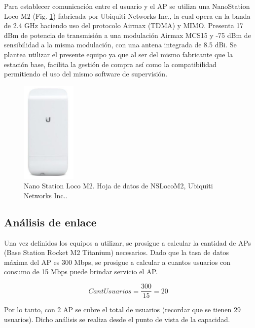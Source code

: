 \documentclass[12pt,a4paper]{book}
\begin{document}
Para establecer comunicación entre el usuario y el AP se utiliza una NanoStation Loco M2 (Fig. \ref{Fig_NSLocoM2}) fabricada por Ubiquiti Networks Inc., la cual opera en la banda de 2.4 GHz haciendo uso del protocolo Airmax (TDMA) y MIMO. Presenta 17 dBm de potencia de transmisión a una modulación Airmax MCS15 y -75 dBm de sensibilidad a la misma modulación, con una antena integrada de 8.5 dBi. Se plantea utilizar el presente equipo ya que al ser del mismo fabricante que la estación base, facilita la gestión de compra así como la compatibilidad permitiendo el uso del mismo software de supervisión.

\medskip

\begin{figure} [H]
\centering
\includegraphics[height= 5cm]{../figuras/NanoStationLocoM2.JPG}
\caption{Nano Station Loco M2. Hoja de datos de NSLocoM2, Ubiquiti Networks Inc..}
\label{Fig_NSLocoM2}
\end{figure}

\medskip

\subsection{Análisis de enlace}\label{sub_analisis_enlace_acc}

Una vez definidos los equipos a utilizar, se prosigue a calcular la cantidad de APs (Base Station Rocket M2 Titanium) necesarios. Dado que la tasa de datos máxima del AP es 300 Mbps, se prosigue a calcular a cuantos usuarios con consumo de 15 Mbps puede brindar servicio el AP.

\begin{equation}\label{ec_CantUsuariosAP}
CantUsuarios = \frac{300}{15} = 20 
\end{equation}

Por lo tanto, con 2 AP se cubre el total de usuarios (recordar que se tienen 29 usuarios). Dicho análisis se realiza desde el punto de vista de la capacidad. 

\medskip
\end{document}
